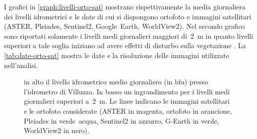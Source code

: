 I grafici in \vref{graph:livelli-orto-sat} mostrano rispettivamente la media giornaliera dei livelli idrometrici e le date di cui si dispongono ortofoto e immagini satellitari (ASTER, Pleiades, Sentinel2, Google~Earth, WorldView2). 
Nel secondo grafico sono riportati solamente i livelli medi giornalieri maggiori di~\SI{2}{\m} in quanto livelli superiori a tale soglia iniziano ad avere effetti di disturbo sulla vegetazione .
La \vref{tab:date-orto-sat} mostra le date e la risoluzione delle immagini utilizzate nell'analisi.
\begin{figure}[p]
	\centering
	
	
	\caption[livelli idrometrici e foto aeree - satellitari]{in alto il livello idrometrico medio giornaliero (in blu) presso l'idrometro di Villuzza. 
	In basso un ingrandimento per i livelli medi giornalieri superiori a~\SI{2}{\m}. Le linee indicano le immagini satellitari e le ortofoto considerate (ASTER in magenta, ortofoto in arancione, Pleiades in verde~acqua, Sentinel2 in azzurro, G-Earth in verde, WorldView2 in nero).}
	\label{graph:livelli-orto-sat}
\end{figure}
